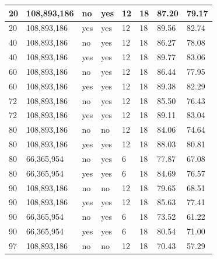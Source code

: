 \begin{table}[]
{\begin{tabular}{|l|l|l|l|l|l|l|l|}
20         & 108,893,186             & no        & yes       & 12         & 18             & 87.20   & 79.17  \\ \hline
20         & 108,893,186             & yes       & yes       & 12         & 18             & 89.56   & 82.74  \\ \hline
40         & 108,893,186             & no        & yes       & 12         & 18             & 86.27   & 78.08  \\ \hline
40         & 108,893,186             & yes       & yes       & 12         & 18             & 89.77   & 83.06  \\ \hline
60         & 108,893,186             & no        & yes       & 12         & 18             & 86.44   & 77.95  \\ \hline
60         & 108,893,186             & yes       & yes       & 12         & 18             & 89.38   & 82.29  \\ \hline
72         & 108,893,186             & no        & yes       & 12         & 18             & 85.50   & 76.43  \\ \hline
72         & 108,893,186             & yes       & yes       & 12         & 18             & 89.11   & 83.04  \\ \hline
80         & 108,893,186            & no        & no        & 12           & 18             & 84.06   & 74.64\\ \hline
80         & 108,893,186            & yes       & yes       & 12           & 18             & 88.03   & 80.81\\ \hline
80         & 66,365,954              & no        & yes       & 6          & 18             & 77.87   & 67.08  \\ \hline
80         & 66,365,954              & yes       & yes       & 6          & 18             & 84.69   & 76.57  \\ \hline
90         & 108,893,186            & no        & no        & 12           & 18             & 79.65   & 68.51\\ \hline
90         & 108,893,186            & yes       & yes       & 12           & 18             & 85.63   & 77.41\\ \hline
90         & 66,365,954              & no        & yes       & 6          & 18             & 73.52   & 61.22  \\ \hline
90         & 66,365,954              & yes       & yes       & 6          & 18             & 80.54   & 71.00  \\ \hline
97         & 108,893,186            & no        & no        & 12           & 18             & 70.43   & 57.29\\ \hline

\end{tabular}}
\end{table}
